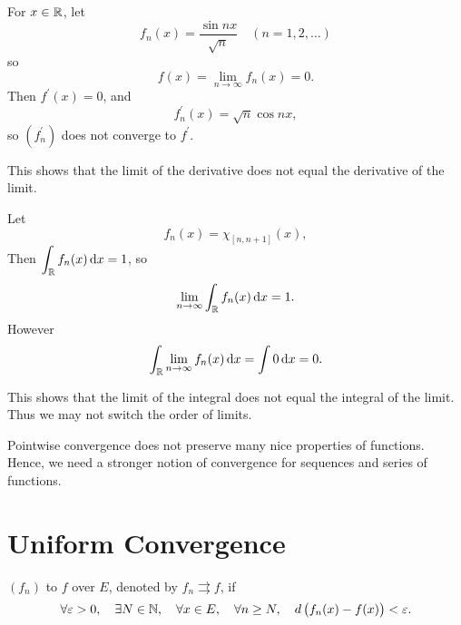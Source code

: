 \begin{example}[Differentiability]
For $x\in\mathbb R$, let
\[f_n(x)=\frac{\sin nx}{\sqrt{n}}\quad(n=1,2,\dots)\]
so
\[f(x)=\lim_{n\to\infty}f_n(x)=0.\]
Then $f^\prime(x)=0$, and
\[f_n^\prime(x)=\sqrt{n}\cos nx,\]
so $(f_n^\prime)$ does not converge to $f^\prime$. 
\end{example}

This shows that the limit of the derivative does not equal the derivative of the limit.

\begin{example}[Integrability]
Let
\[f_n(x)=\chi_{[n,n+1]}(x),\]
Then $\displaystyle\int_\mathbb R f_n(x)\dd{x}=1$, so
\[\lim_{n\to\infty}\int_\mathbb R f_n(x)\dd{x}=1.\]
However
\[\int_\mathbb R\lim_{n\to\infty}f_n(x)\dd{x}=\int 0\dd{x}=0.\]
\end{example}

This shows that the limit of the integral does not equal the integral of the limit. Thus we may not switch the order of limits.

\begin{comment}
\begin{example}[Integrability]
$f_n$ integrable, $f$ not integrable

Recall that the Dirichlet function
\[f(x)=\begin{cases}
1&(x\in\QQ)\\
0&(x\in\RR\setminus\QQ)
\end{cases}\]
is not integrable.

We define a sequence of functions as follows:
\[f_n(x)=\begin{cases}
1&\text{if }x=\frac{p}{q},p\in\ZZ,q\in\ZZ\setminus\{0\},|q|\le n\\
0&\text{if otherwise}
\end{cases}\]
\end{example}
\end{comment}

Pointwise convergence does not preserve many nice properties of functions. Hence, we need a stronger notion of convergence for sequences and series of functions.
\pagebreak

\section{Uniform Convergence}
\begin{definition}
$(f_n)$  to $f$ over $E$, denoted by $f_n\rightrightarrows f$, if 
\[\forall\varepsilon>0,\quad\exists N\in\mathbb N,\quad\forall x\in E,\quad\forall n\ge N,\quad d\left(f_n(x)-f(x)\right)<\varepsilon.\]
\end{definition}

